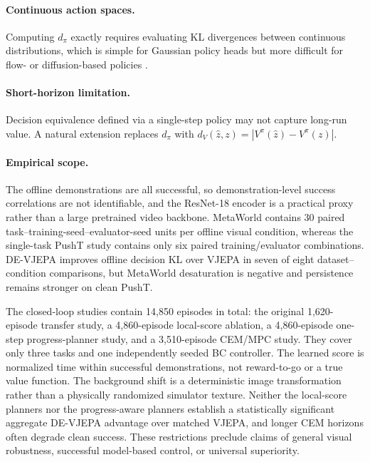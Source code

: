\documentclass[10pt,twocolumn]{article}
\theoremstyle{tightstyle}
\begin{document}
\paragraph{Continuous action spaces.}
Computing $d_\pi$ exactly requires evaluating KL divergences between continuous
distributions, which is simple for Gaussian policy heads but more difficult for
flow- or diffusion-based policies \citep{chi2023diffusionpolicy}.

\paragraph{Short-horizon limitation.}
Decision equivalence defined via a single-step policy may not capture long-run value.
A natural extension replaces $d_\pi$ with
$d_V(\hat{z}, z) = |V^\pi(\hat{z}) - V^\pi(z)|$.

\paragraph{Empirical scope.}
The offline demonstrations are all successful, so demonstration-level
success correlations are not identifiable, and the ResNet-18 encoder is a
practical proxy rather than a large pretrained video backbone. MetaWorld
contains 30 paired task--training-seed--evaluator-seed units per offline visual
condition, whereas the single-task PushT study contains only six paired
training/evaluator combinations. DE-VJEPA improves offline decision KL over
VJEPA in seven of eight dataset--condition comparisons, but MetaWorld
desaturation is negative and persistence remains stronger on clean PushT.

The closed-loop studies contain 14,850 episodes in total: the original
1,620-episode transfer study, a 4,860-episode local-score ablation, a
4,860-episode one-step progress-planner study, and a 3,510-episode CEM/MPC
study. They cover only three tasks and one independently seeded BC controller.
The learned score is normalized time within successful demonstrations, not
reward-to-go or a true value function. The
background shift is a deterministic image transformation rather than a
physically randomized simulator texture. Neither the local-score planners nor
the progress-aware planners establish a statistically significant aggregate
DE-VJEPA advantage over matched VJEPA, and longer CEM horizons often degrade
clean success. These restrictions preclude claims of general visual
robustness, successful model-based control, or universal superiority.

\iffalse
\end{document}
